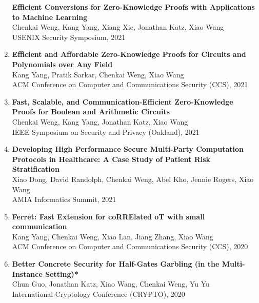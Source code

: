 \documentclass[letterpaper,11pt]{article}
\begin{document}
\begin{enumerate}[leftmargin=0.20in]
          {\textbf{\small Efficient Conversions for Zero-Knowledge Proofs with Applications to Machine Learning}} \\
		{\small Chenkai Weng, Kang Yang, Xiang Xie, Jonathan Katz, Xiao Wang \vspace{-2pt}} \\
		{\small USENIX Security Symposium, 2021}
  \item
	  {\textbf{\small Efficient and Affordable Zero-Knowledge Proofs for Circuits and Polynomials over Any Field}} \\
		{\small Kang Yang, Pratik Sarkar, Chenkai Weng, Xiao Wang \vspace{-2pt}} \\
		{\small ACM Conference on Computer and Communications Security (CCS), 2021}
  \item
          {\textbf{\small Fast, Scalable, and Communication-Efficient Zero-Knowledge Proofs for Boolean and Arithmetic Circuits}} \\
		{\small Chenkai Weng, Kang Yang, Jonathan Katz, Xiao Wang \vspace{-2pt}} \\
		{\small IEEE Symposium on Security and Privacy (Oakland), 2021}
  \item
          {\textbf{\small Developing High Performance Secure Multi-Party Computation Protocols in Healthcare: A Case Study of Patient Risk Stratification}} \\
		{\small Xiao Dong, David Randolph, Chenkai Weng, Abel Kho, Jennie Rogers, Xiao Wang \vspace{-2pt}} \\
		{\small AMIA Informatics Summit, 2021}
  \item
          {\textbf{\small Ferret: Fast Extension for coRRElated oT with small communication}} \\
		{\small Kang Yang, Chenkai Weng, Xiao Lan, Jiang Zhang, Xiao Wang\vspace{-2pt}} \\
		{\small ACM Conference on Computer and Communications Security (CCS), 2020}
  \item
          {\textbf{\small Better Concrete Security for Half-Gates Garbling (in the Multi-Instance Setting)*}} \\
		{\small Chun Guo, Jonathan Katz, Xiao Wang, Chenkai Weng, Yu Yu\vspace{-2pt}} \\ 
		{\small International Cryptology Conference (CRYPTO), 2020}
\end{enumerate}
\end{document}
